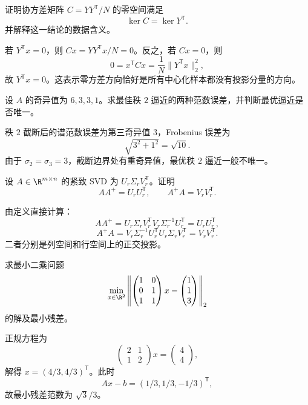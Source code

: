 \begin{exercise}[level=standard]
证明协方差矩阵 $C=YY^{\mathsf T}/N$ 的零空间满足
\[
\ker C=\ker Y^{\mathsf T}.
\]
并解释这一结论的数据含义。
\begin{solution}
若 $Y^{\mathsf T}x=0$，则 $Cx=YY^{\mathsf T}x/N=0$。反之，若 $Cx=0$，则
\[
0=x^{\mathsf T}Cx=\frac1N\lVert Y^{\mathsf T}x\rVert_2^2,
\]
故 $Y^{\mathsf T}x=0$。这表示零方差方向恰好是所有中心化样本都没有投影分量的方向。
\end{solution}
\end{exercise}

\begin{exercise}[level=standard]
设 $A$ 的奇异值为 $6,3,3,1$。求最佳秩 $2$ 逼近的两种范数误差，并判断最优逼近是否唯一。
\begin{solution}
秩 $2$ 截断后的谱范数误差为第三奇异值 $3$，Frobenius 误差为
\[
\sqrt{3^2+1^2}=\sqrt{10}.
\]
由于 $\sigma_2=\sigma_3=3$，截断边界处有重奇异值，最优秩 $2$ 逼近一般不唯一。
\end{solution}
\end{exercise}

\begin{exercise}[level=standard]
设 $A\in\R^{m\times n}$ 的紧致 SVD 为 $U_r\Sigma_rV_r^{\mathsf T}$。证明
\[
AA^+=U_rU_r^{\mathsf T},
\qquad
A^+A=V_rV_r^{\mathsf T}.
\]
\begin{solution}
由定义直接计算：
\[
AA^+
=U_r\Sigma_rV_r^{\mathsf T}V_r\Sigma_r^{-1}U_r^{\mathsf T}
=U_rU_r^{\mathsf T},
\]
\[
A^+A
=V_r\Sigma_r^{-1}U_r^{\mathsf T}U_r\Sigma_rV_r^{\mathsf T}
=V_rV_r^{\mathsf T}.
\]
二者分别是列空间和行空间上的正交投影。
\end{solution}
\end{exercise}

\begin{exercise}[level=standard]
求最小二乘问题
\[
\min_{x\in\R^2}\left\lVert
\begin{pmatrix}1&0\\0&1\\1&1\end{pmatrix}x-
\begin{pmatrix}1\\1\\3\end{pmatrix}
\right\rVert_2
\]
的解及最小残差。
\begin{solution}
正规方程为
\[
\begin{pmatrix}2&1\\1&2\end{pmatrix}x
=\begin{pmatrix}4\\4\end{pmatrix},
\]
解得 $x=(4/3,4/3)^{\mathsf T}$。此时
\[
Ax-b=(1/3,1/3,-1/3)^{\mathsf T},
\]
故最小残差范数为 $\sqrt3/3$。
\end{solution}
\end{exercise}

